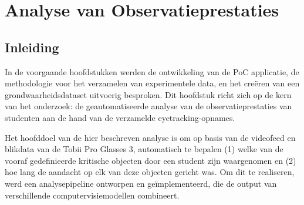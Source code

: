 \chapter{Analyse van Observatieprestaties}
\label{ch:analyse}

\section{Inleiding}

In de voorgaande hoofdstukken werden de ontwikkeling van de PoC applicatie, de methodologie voor het verzamelen 
van experimentele data, en het creëren van een grondwaarheidsdataset uitvoerig besproken. 
Dit hoofdstuk richt zich op de kern van het onderzoek: de geautomatiseerde analyse van de 
observatieprestaties van studenten aan de hand van de verzamelde eyetracking-opnames.

Het hoofddoel van de hier beschreven analyse is om op basis van de videofeed en blikdata van de Tobii Pro Glasses 3, 
automatisch te bepalen (1) welke van de vooraf gedefinieerde kritische objecten door een student zijn waargenomen en (2) 
hoe lang de aandacht op elk van deze objecten gericht was. 
Om dit te realiseren, werd een analysepipeline ontworpen en geïmplementeerd, die de output van verschillende computervisiemodellen combineert.

